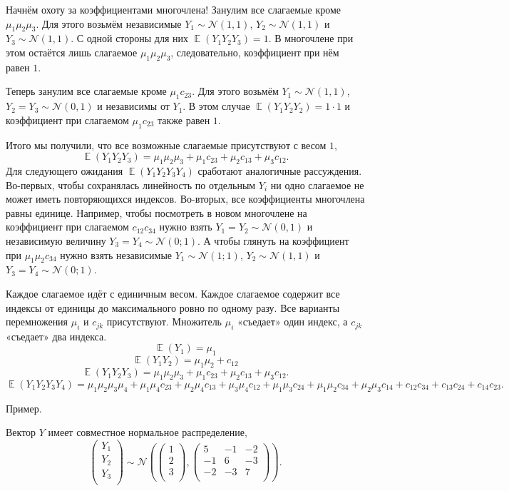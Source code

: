 \documentclass[12pt]{article}
\DeclareMathOperator{\E}{\mathbb{E}}
\newcommand{\cN}{\mathcal{N}}
\begin{document}
Начнём охоту за коэффициентами многочлена! Занулим все слагаемые кроме $\mu_1 \mu_2 \mu_3$.
Для этого возьмём независимые $Y_1 \sim \cN(1, 1)$, $Y_2\sim \cN(1, 1)$ и $Y_3\sim \cN(1, 1)$.
С одной стороны для них $\E(Y_1 Y_2 Y_3) = 1$. 
В многочлене при этом остаётся лишь слагаемое $\mu_1 \mu_2 \mu_3$,
следовательно, коэффициент при нём равен $1$.

Теперь занулим все слагаемые кроме $\mu_1 c_{23}$.
Для этого возьмём $Y_1 \sim \cN(1, 1)$, $Y_2 = Y_3 \sim \cN(0, 1)$ и независимы от $Y_1$.
В этом случае $\E(Y_1 Y_2 Y_2) = 1 \cdot 1$ и коэффициент при слагаемом $\mu_1 c_{23}$ также равен $1$.

Итого мы получили, что все возможные слагаемые присутствуют с весом $1$,
\[
    \E(Y_1 Y_2 Y_3) = \mu_1 \mu_2 \mu_3 + \mu_1 c_{23} + \mu_2 c_{13} + \mu_3 c_{12}.
\]
Для следующего ожидания $\E(Y_1 Y_2 Y_3 Y_4)$ сработают аналогичные рассуждения. 
Во-первых, чтобы сохранялась линейность по отдельным $Y_i$ ни одно слагаемое не может иметь повторяющихся индексов.
Во-вторых, все коэффициенты многочлена равны единице. 
Например, чтобы посмотреть в новом многочлене на коэффициент при слагаемом $c_{12}c_{34}$ нужно взять $Y_1 = Y_2 \sim \cN(0, 1)$ 
и независимую величину $Y_3 = Y_4 \sim \cN(0;1)$. 
А чтобы глянуть на коэффициент при $\mu_1 \mu_2 c_{34}$ нужно взять независимые $Y_1 \sim \cN(1;1)$, $Y_2 \sim \cN(1,1)$ и 
 $Y_3 = Y_4 \sim \cN(0;1)$. 
\begin{tcolorbox}[colback=yellow!50!red!25!white]
    Каждое слагаемое идёт с единичным весом.
    Каждое слагаемое содержит все индексы от единицы до максимального ровно по одному разу. 
    Все варианты перемножения $\mu_i$ и $c_{jk}$ присутствуют. 
    Множитель $\mu_i$ «съедает» один индекс, а $c_{jk}$ «съедает» два индекса. 
\[
\E(Y_1) = \mu_1
\]
\[
\E(Y_1 Y_2) = \mu_1 \mu_2 + c_{12}
\]
\[
    \E(Y_1 Y_2 Y_3) = \mu_1 \mu_2 \mu_3 + \mu_1 c_{23} + \mu_2 c_{13} + \mu_3 c_{12}.
\]
\[
    \E(Y_1 Y_2 Y_3 Y_4) = \mu_1 \mu_2\mu_3 \mu_4 + \mu_1 \mu_4 c_{23} + \mu_2 \mu_4 c_{13} + \mu_3 \mu_4 c_{12} + \mu_1 \mu_3 c_{24} + \mu_1 \mu_2 c_{34} + \mu_2 \mu_3 c_{14} +  c_{12}c_{34} + c_{13}c_{24} + c_{14}c_{23}.
\]
\end{tcolorbox}


Пример.

Вектор $Y$ имеет совместное нормальное распределение,
\[
\begin{pmatrix}
    Y_1 \\
    Y_2 \\
    Y_3 \\
\end{pmatrix} \sim \cN\left(
\begin{pmatrix}
    1 \\
    2 \\
    3 \\
\end{pmatrix},
\begin{pmatrix}
    5 & -1 & -2 \\
    -1 & 6 & -3 \\
    -2 & -3 & 7 \\
\end{pmatrix}
\right).
\]
\end{document}
